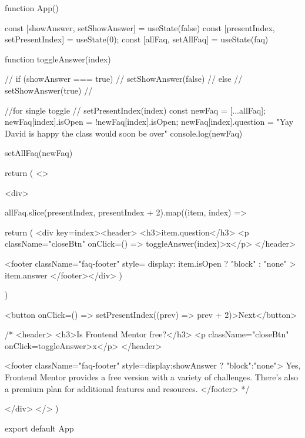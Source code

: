 function App() {
  const [showAnswer, setShowAnswer] = useState(false)
  const [presentIndex, setPresentIndex] = useState(0);
  const [allFaq, setAllFaq] = useState(faq)


  function toggleAnswer(index) {
    // if (showAnswer === true){
    //   setShowAnswer(false)
    // } else{
    //   setShowAnswer(true)
    // }

    //for single toggle
    // setPresentIndex(index)
    const newFaq = [...allFaq];
    newFaq[index].isOpen = !newFaq[index].isOpen;
    newFaq[index].question = "Yay David is happy the class would soon be over"
    console.log(newFaq)


    setAllFaq(newFaq)

  }

  return (
    <>

      <div>
        {
          allFaq.slice(presentIndex, presentIndex + 2).map((item, index) => {
            return (
              <div key={index}><header>
                <h3>{item.question}</h3>
                <p className="closeBtn" onClick={() => toggleAnswer(index)}>x</p>
              </header>

                <footer className="faq-footer" style={{ display: item.isOpen ? "block" : "none" }}>
                  {item.answer}
                </footer></div>
            )
          })
        }
        <button onClick={() => setPresentIndex((prev) => prev + 2)}>Next</button>
        {/* <header>
            <h3>Is Frontend Mentor free?</h3>
            <p className="closeBtn" onClick={toggleAnswer}>x</p>
          </header>
 
         <footer className="faq-footer" style={{display:showAnswer ? "block":"none"}}>
            Yes, Frontend Mentor provides a free version with a variety of
            challenges. There's also a premium plan for additional features and
            resources.
          </footer> */}
      </div>
    </>
  )
}

export default App